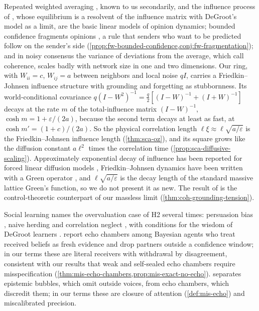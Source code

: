 Repeated weighted averaging \citep{degroot1974reaching}, known to us secondarily, and the influence process of \citet{friedkin1990social}, whose equilibrium is a resolvent of the influence matrix with DeGroot's model as a limit, are the basic linear models of opinion dynamics; bounded confidence fragments opinions \citep{hegselmann2002opinion,deffuant2000mixing}, a rule that senders who want to be predicted follow on the sender's side (\cref{prop:fw-bounded-confidence,conj:fw-fragmentation}); and in noisy consensus the variance of deviations from the average, which \citet{bamieh2012coherence} call coherence, scales badly with network size in one and two dimensions. Our ring, with $W_{ii}=c$, $W_{ij}=a$ between neighbors and local noise $qI$, carries a Friedkin--Johnsen influence structure with grounding and forgetting as stubbornness. Its world-conditional covariance $q(I-W^2)^{-1}=\tfrac q2[(I-W)^{-1}+(I+W)^{-1}]$ decays at the rate $m$ of the total-influence matrix $(I-W)^{-1}$, $\cosh m=1+\varepsilon/(2a)$, because the second term decays at least as fast, at $\cosh m'=(1+c)/(2a)$. So the physical correlation length $\ell\xi\approx\ell\sqrt{a/\varepsilon}$ is the Friedkin--Johnsen influence length (\cref{thm:sca-oz}), and its square grows like the diffusion constant $a\ell^2$ times the correlation time (\cref{prop:sca-diffusive-scaling}). Approximately exponential decay of influence has been reported for forced linear diffusion models \citep{murraywatters2026decay}, Friedkin--Johnsen dynamics have been written with a Green operator \citep{boudourides2026boundary}, and $\ell\sqrt{a/\varepsilon}$ is the decay length of the standard massive lattice Green's function, so we do not present it as new. The result of \citet{bamieh2012coherence} is the control-theoretic counterpart of our massless limit (\cref{thm:coh-grounding-tension}).

Social learning names the overvaluation case of H2 several times: persuasion bias \citep{demarzo2003persuasion}, naive herding \citep{eyster2010naive} and correlation neglect \citep{enke2019correlation}, with conditions for the wisdom of DeGroot learners \citep{golub2010naive}. \citet{madsen2018large} report echo chambers among Bayesian agents who treat received beliefs as fresh evidence and drop partners outside a confidence window; in our terms these are literal receivers with withdrawal by disagreement, consistent with our results that weak and self-sealed echo chambers require misspecification (\cref{thm:mis-echo-chambers,prop:mis-exact-no-echo}). \citet{nguyen2020echo} separates epistemic bubbles, which omit outside voices, from echo chambers, which discredit them; in our terms these are closure of attention (\cref{def:mis-echo}) and miscalibrated precision.

